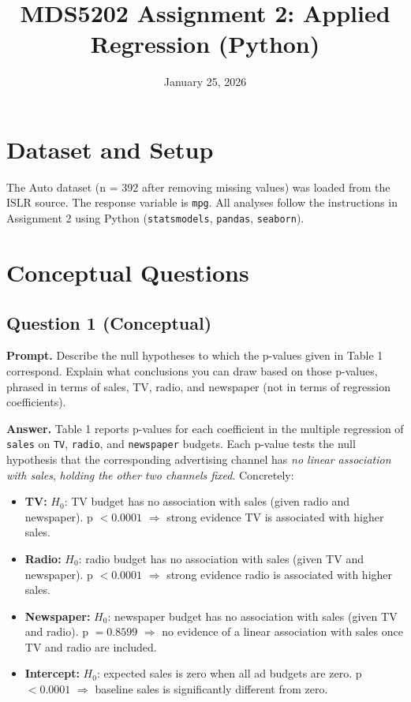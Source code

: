 \documentclass[11pt]{article}
\title{MDS5202 Assignment 2: Applied Regression (Python)}
\author{}
\date{January 25, 2026}
\begin{document}
\maketitle

\section*{Dataset and Setup}
The Auto dataset (n = 392 after removing missing values) was loaded from the ISLR source. The response variable is \texttt{mpg}. All analyses follow the instructions in Assignment 2 using Python (\texttt{statsmodels}, \texttt{pandas}, \texttt{seaborn}).

\section*{Conceptual Questions}
\subsection*{Question 1 (Conceptual)}
\textbf{Prompt.} Describe the null hypotheses to which the p-values given in Table 1 correspond. Explain what conclusions you can draw based on those p-values, phrased in terms of sales, TV, radio, and newspaper (not in terms of regression coefficients).

\textbf{Answer.} Table 1 reports p-values for each coefficient in the multiple regression of \texttt{sales} on \texttt{TV}, \texttt{radio}, and \texttt{newspaper} budgets. Each p-value tests the null hypothesis that the corresponding advertising channel has \emph{no linear association with sales}, \emph{holding the other two channels fixed}. Concretely:
\begin{itemize}
  \item \textbf{TV:} $H_0$: TV budget has no association with sales (given radio and newspaper). p $< 0.0001$ $\Rightarrow$ strong evidence TV is associated with higher sales.
  \item \textbf{Radio:} $H_0$: radio budget has no association with sales (given TV and newspaper). p $< 0.0001$ $\Rightarrow$ strong evidence radio is associated with higher sales.
  \item \textbf{Newspaper:} $H_0$: newspaper budget has no association with sales (given TV and radio). p $= 0.8599$ $\Rightarrow$ no evidence of a linear association with sales once TV and radio are included.
  \item \textbf{Intercept:} $H_0$: expected sales is zero when all ad budgets are zero. p $< 0.0001$ $\Rightarrow$ baseline sales is significantly different from zero.
\end{itemize}
\end{document}
